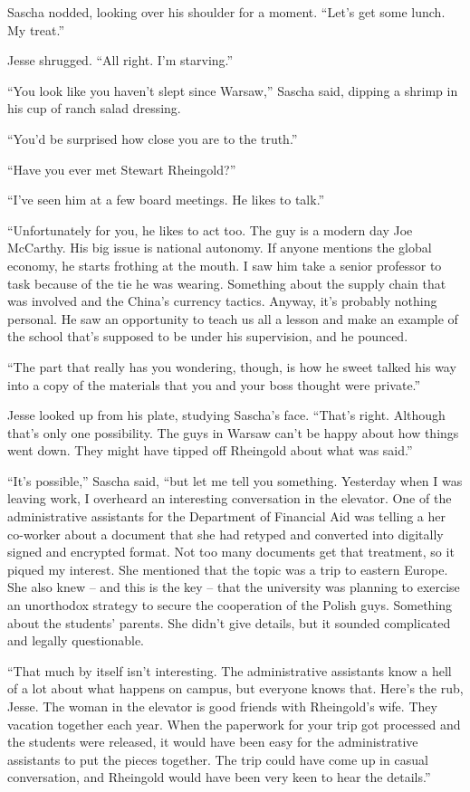 \documentclass[12pt]{book}
\begin{document}
Sascha nodded, looking over his shoulder for a moment.  ``Let's get some lunch.  My treat.''

Jesse shrugged.  ``All right.  I'm starving.''


``You look like you haven't slept since Warsaw,'' Sascha said, dipping a shrimp in his cup of ranch salad dressing.

``You'd be surprised how close you are to the truth.''

``Have you ever met Stewart Rheingold?''

``I've seen him at a few board meetings.  He likes to talk.''

``Unfortunately for you, he likes to act too.  The guy is a modern day Joe McCarthy.  His big issue is national autonomy.  If anyone mentions the global economy, he starts frothing at the mouth.  I saw him take a senior professor to task because of the tie he was wearing.  Something about the supply chain that was involved and the China's currency tactics.  Anyway, it's probably nothing personal.  He saw an opportunity to teach us all a lesson and make an example of the school that's supposed to be under his supervision, and he pounced.

``The part that really has you wondering, though, is how he sweet talked his way into a copy of the materials that you and your boss thought were private.''

Jesse looked up from his plate, studying Sascha's face.  ``That's right.  Although that's only one possibility.  The guys in Warsaw can't be happy about how things went down.  They might have tipped off Rheingold about what was said.''

``It's possible,'' Sascha said, ``but let me tell you something.  Yesterday when I was leaving work, I overheard an interesting conversation in the elevator.  One of the administrative assistants for the Department of Financial Aid was telling a her co-worker about a document that she had retyped and converted into digitally signed and encrypted format.  Not too many documents get that treatment, so it piqued my interest.  She mentioned that the topic was a trip to eastern Europe.  She also knew -- and this is the key -- that the university was planning to exercise an unorthodox strategy to secure the cooperation of the Polish guys.  Something about the students' parents.  She didn't give details, but it sounded complicated and legally questionable.

``That much by itself isn't interesting.  The administrative assistants know a hell of a lot about what happens on campus, but everyone knows that.  Here's the rub, Jesse.  The woman in the elevator is good friends with Rheingold's wife.  They vacation together each year.  When the paperwork for your trip got processed and the students were released, it would have been easy for the administrative assistants to put the pieces together.  The trip could have come up in casual conversation, and Rheingold would have been very keen to hear the details.''
\end{document}
